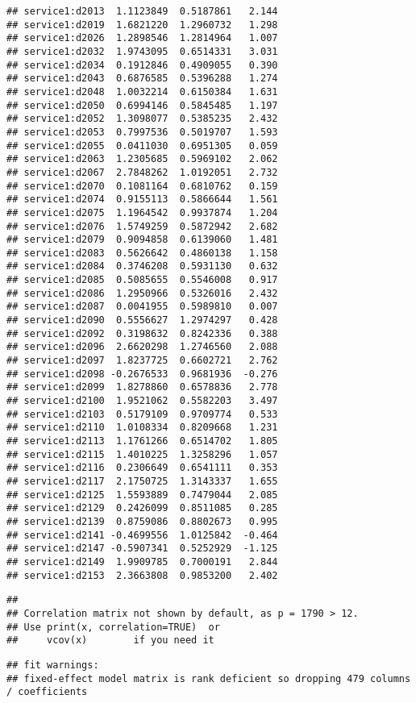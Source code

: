 \documentclass[
]{article}
\begin{document}
\begin{verbatim}
## service1:d2013  1.1123849  0.5187861   2.144
## service1:d2019  1.6821220  1.2960732   1.298
## service1:d2026  1.2898546  1.2814964   1.007
## service1:d2032  1.9743095  0.6514331   3.031
## service1:d2034  0.1912846  0.4909055   0.390
## service1:d2043  0.6876585  0.5396288   1.274
## service1:d2048  1.0032214  0.6150384   1.631
## service1:d2050  0.6994146  0.5845485   1.197
## service1:d2052  1.3098077  0.5385235   2.432
## service1:d2053  0.7997536  0.5019707   1.593
## service1:d2055  0.0411030  0.6951305   0.059
## service1:d2063  1.2305685  0.5969102   2.062
## service1:d2067  2.7848262  1.0192051   2.732
## service1:d2070  0.1081164  0.6810762   0.159
## service1:d2074  0.9155113  0.5866644   1.561
## service1:d2075  1.1964542  0.9937874   1.204
## service1:d2076  1.5749259  0.5872942   2.682
## service1:d2079  0.9094858  0.6139060   1.481
## service1:d2083  0.5626642  0.4860138   1.158
## service1:d2084  0.3746208  0.5931130   0.632
## service1:d2085  0.5085655  0.5546008   0.917
## service1:d2086  1.2950966  0.5326016   2.432
## service1:d2087  0.0041955  0.5989810   0.007
## service1:d2090  0.5556627  1.2974297   0.428
## service1:d2092  0.3198632  0.8242336   0.388
## service1:d2096  2.6620298  1.2746560   2.088
## service1:d2097  1.8237725  0.6602721   2.762
## service1:d2098 -0.2676533  0.9681936  -0.276
## service1:d2099  1.8278860  0.6578836   2.778
## service1:d2100  1.9521062  0.5582203   3.497
## service1:d2103  0.5179109  0.9709774   0.533
## service1:d2110  1.0108334  0.8209668   1.231
## service1:d2113  1.1761266  0.6514702   1.805
## service1:d2115  1.4010225  1.3258296   1.057
## service1:d2116  0.2306649  0.6541111   0.353
## service1:d2117  2.1750725  1.3143337   1.655
## service1:d2125  1.5593889  0.7479044   2.085
## service1:d2129  0.2426099  0.8511085   0.285
## service1:d2139  0.8759086  0.8802673   0.995
## service1:d2141 -0.4699556  1.0125842  -0.464
## service1:d2147 -0.5907341  0.5252929  -1.125
## service1:d2149  1.9909785  0.7000191   2.844
## service1:d2153  2.3663808  0.9853200   2.402
\end{verbatim}

\begin{verbatim}
## 
## Correlation matrix not shown by default, as p = 1790 > 12.
## Use print(x, correlation=TRUE)  or
##     vcov(x)        if you need it
\end{verbatim}

\begin{verbatim}
## fit warnings:
## fixed-effect model matrix is rank deficient so dropping 479 columns / coefficients
\end{verbatim}
\end{document}
